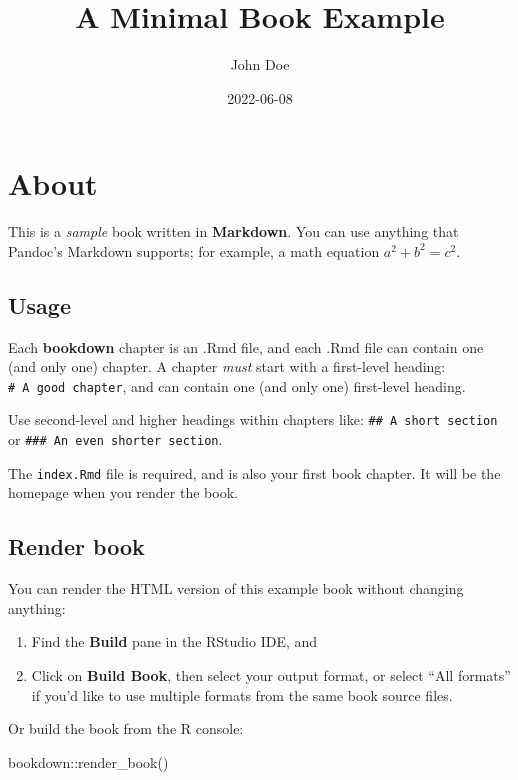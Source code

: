\documentclass[
]{book}
\title{A Minimal Book Example}
\author{John Doe}
\date{2022-06-08}
\newenvironment{Shaded}{\begin{snugshade}}{\end{snugshade}}
\newcommand{\FunctionTok}[1]{\textcolor[rgb]{0.00,0.00,0.00}{#1}}
\newcommand{\NormalTok}[1]{#1}
\newcommand{\SpecialCharTok}[1]{\textcolor[rgb]{0.00,0.00,0.00}{#1}}
\theoremstyle{definition}
\theoremstyle{definition}
\theoremstyle{definition}
\theoremstyle{definition}
\theoremstyle{remark}
\begin{document}
\maketitle

{
\setcounter{tocdepth}{1}
\tableofcontents
}
\hypertarget{about}{%
\chapter{About}\label{about}}

This is a \emph{sample} book written in \textbf{Markdown}. You can use anything that Pandoc's Markdown supports; for example, a math equation \(a^2 + b^2 = c^2\).

\hypertarget{usage}{%
\section{Usage}\label{usage}}

Each \textbf{bookdown} chapter is an .Rmd file, and each .Rmd file can contain one (and only one) chapter. A chapter \emph{must} start with a first-level heading: \texttt{\#\ A\ good\ chapter}, and can contain one (and only one) first-level heading.

Use second-level and higher headings within chapters like: \texttt{\#\#\ A\ short\ section} or \texttt{\#\#\#\ An\ even\ shorter\ section}.

The \texttt{index.Rmd} file is required, and is also your first book chapter. It will be the homepage when you render the book.

\hypertarget{render-book}{%
\section{Render book}\label{render-book}}

You can render the HTML version of this example book without changing anything:

\begin{enumerate}
\def\labelenumi{\arabic{enumi}.}
\item
  Find the \textbf{Build} pane in the RStudio IDE, and
\item
  Click on \textbf{Build Book}, then select your output format, or select ``All formats'' if you'd like to use multiple formats from the same book source files.
\end{enumerate}

Or build the book from the R console:

\begin{Shaded}
\begin{Highlighting}[]
\NormalTok{bookdown}\SpecialCharTok{::}\FunctionTok{render\_book}\NormalTok{()}
\end{Highlighting}
\end{Shaded}
\end{document}
